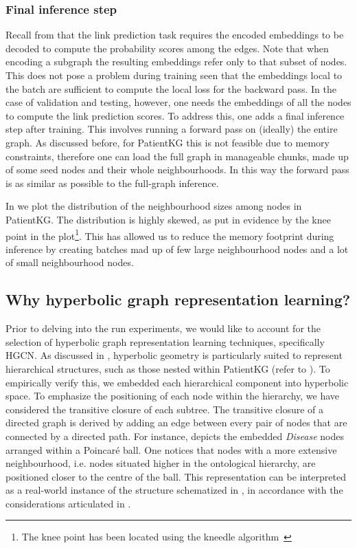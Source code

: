 \subsubsection{Final inference step}
Recall from  that the link prediction task requires the encoded embeddings to be decoded to compute the probability scores among the edges. Note that when encoding a subgraph the resulting embeddings refer only to that subset of nodes. This does not pose a problem during training seen that the embeddings local to the batch are sufficient to compute the local loss for the backward pass. In the case of validation and testing, however, one needs the embeddings of all the nodes to compute the link prediction scores. To address this, one adds a final inference step after training. This involves running a forward pass on (ideally) the entire graph. As discussed before, for PatientKG this is not feasible due to memory constraints, therefore one can load the full graph in manageable chunks, made up of some seed nodes and their whole neighbourhoods. In this way the forward pass is as similar as possible to the full-graph inference. 

In  we plot the distribution of the neighbourhood sizes among nodes in PatientKG. The distribution is highly skewed, as put in evidence by the knee point in the plot\footnote{The knee point has been located using the kneedle algorithm~\cite{satopaa2011KneePointDetection}}. This has allowed us to reduce the memory footprint during inference by creating batches mad up of few large neighbourhood nodes and a lot of small neighbourhood nodes. 

\subsection{Why hyperbolic graph representation learning?}\label{sec:hypPatientKG}
Prior to delving into the run experiments, we would like to account for the selection of hyperbolic graph representation learning techniques, specifically HGCN. As discussed in , hyperbolic geometry is particularly suited to represent hierarchical structures, such as those nested within PatientKG (refer to ). To empirically verify this, we embedded each hierarchical component into hyperbolic space. To emphasize the positioning of each node within the hierarchy, we have considered the transitive closure of each subtree. The transitive closure of a directed graph is derived by adding an edge between every pair of nodes that are connected by a directed path. For instance,  depicts the embedded \emph{Disease} nodes arranged within a Poincaré ball. One notices that nodes with a more extensive neighbourhood, i.e. nodes situated higher in the ontological hierarchy, are positioned closer to the centre of the ball. This representation can be interpreted as a real-world instance of the structure schematized in , in accordance with the considerations articulated in . 


